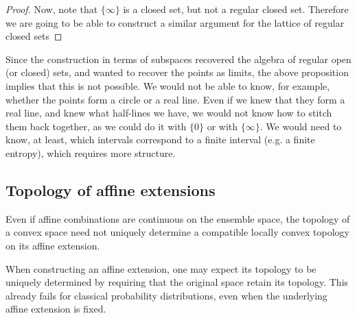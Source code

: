 \begin{proof}
	Now, note that $\{\infty\}$ is a closed set, but not a regular closed set. Therefore we are going to be able to construct a similar argument for the lattice of regular closed sets
\end{proof}

Since the construction in terms of subspaces recovered the algebra of regular open (or closed) sets, and wanted to recover the points as limits, the above proposition implies that this is not possible. We would not be able to know, for example, whether the points form a circle or a real line. Even if we knew that they form a real line, and knew what half-lines we have, we would not know how to stitch them back together, as we could do it with $\{0\}$ or with $\{\infty\}$. We would need to know, at least, which intervals correspond to a finite interval (e.g. a finite entropy), which requires more structure.

\subsection{Topology of affine extensions}\label{pm-es-lessonTopologyExtensions}

\begin{insight}
	Even if affine combinations are continuous on the ensemble space, the topology of a convex space need not uniquely determine a compatible locally convex topology on its affine extension.
\end{insight}

When constructing an affine extension, one may expect its topology to be uniquely determined by requiring that the original space retain its topology. This already fails for classical probability distributions, even when the underlying affine extension is fixed.

